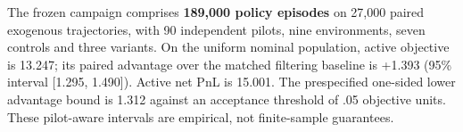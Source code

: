 The frozen campaign comprises \textbf{189,000 policy episodes} on 27,000 paired exogenous trajectories, with 90 independent pilots, nine environments, seven controls and three variants. On the uniform nominal population, active objective is 13.247; its paired advantage over the matched filtering baseline is +1.393 (95\% interval [1.295, 1.490]). Active net PnL is 15.001. The prespecified one-sided lower advantage bound is 1.312 against an acceptance threshold of .05 objective units. These pilot-aware intervals are empirical, not finite-sample guarantees.
